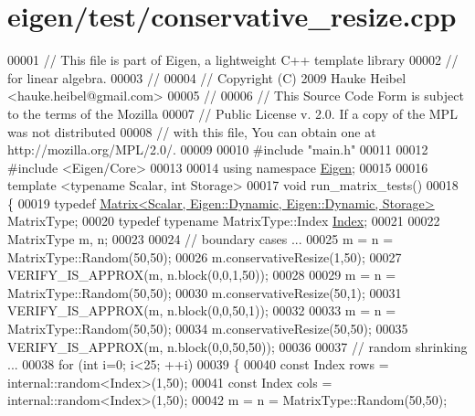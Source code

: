 \hypertarget{eigen_2test_2conservative__resize_8cpp_source}{}\section{eigen/test/conservative\+\_\+resize.cpp}
\label{eigen_2test_2conservative__resize_8cpp_source}

\begin{DoxyCode}
00001 \textcolor{comment}{// This file is part of Eigen, a lightweight C++ template library}
00002 \textcolor{comment}{// for linear algebra.}
00003 \textcolor{comment}{//}
00004 \textcolor{comment}{// Copyright (C) 2009 Hauke Heibel <hauke.heibel@gmail.com>}
00005 \textcolor{comment}{//}
00006 \textcolor{comment}{// This Source Code Form is subject to the terms of the Mozilla}
00007 \textcolor{comment}{// Public License v. 2.0. If a copy of the MPL was not distributed}
00008 \textcolor{comment}{// with this file, You can obtain one at http://mozilla.org/MPL/2.0/.}
00009 
00010 \textcolor{preprocessor}{#include "main.h"}
00011 
00012 \textcolor{preprocessor}{#include <Eigen/Core>}
00013 
00014 \textcolor{keyword}{using namespace }\hyperlink{namespace_eigen}{Eigen};
00015 
00016 \textcolor{keyword}{template} <\textcolor{keyword}{typename} Scalar, \textcolor{keywordtype}{int} Storage>
00017 \textcolor{keywordtype}{void} run\_matrix\_tests()
00018 \{
00019   \textcolor{keyword}{typedef} \hyperlink{group___core___module_class_eigen_1_1_matrix}{Matrix<Scalar, Eigen::Dynamic, Eigen::Dynamic, Storage>}
       MatrixType;
00020   \textcolor{keyword}{typedef} \textcolor{keyword}{typename} MatrixType::Index \hyperlink{namespace_eigen_a62e77e0933482dafde8fe197d9a2cfde}{Index};
00021 
00022   MatrixType m, n;
00023 
00024   \textcolor{comment}{// boundary cases ...}
00025   m = n = MatrixType::Random(50,50);
00026   m.conservativeResize(1,50);
00027   VERIFY\_IS\_APPROX(m, n.block(0,0,1,50));
00028 
00029   m = n = MatrixType::Random(50,50);
00030   m.conservativeResize(50,1);
00031   VERIFY\_IS\_APPROX(m, n.block(0,0,50,1));
00032 
00033   m = n = MatrixType::Random(50,50);
00034   m.conservativeResize(50,50);
00035   VERIFY\_IS\_APPROX(m, n.block(0,0,50,50));
00036 
00037   \textcolor{comment}{// random shrinking ...}
00038   \textcolor{keywordflow}{for} (\textcolor{keywordtype}{int} i=0; i<25; ++i)
00039   \{
00040     \textcolor{keyword}{const} Index rows = internal::random<Index>(1,50);
00041     \textcolor{keyword}{const} Index cols = internal::random<Index>(1,50);
00042     m = n = MatrixType::Random(50,50);

\end{DoxyCode}
